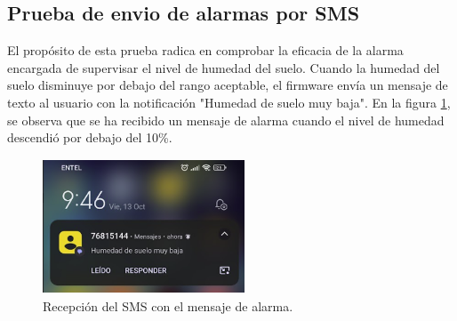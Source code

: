\subsection{Prueba de envio de alarmas por SMS}
El propósito de esta prueba radica en comprobar la eficacia de la alarma encargada de supervisar el nivel de humedad del suelo. Cuando la humedad del suelo disminuye por debajo del rango aceptable, el firmware envía un mensaje de texto al usuario con la notificación "Humedad de suelo muy baja". En la figura \ref{fig:sms alarma}, se observa que se ha recibido un mensaje de alarma cuando el nivel de humedad descendió por debajo del 10\%.

\begin{figure}[h!]
  \centering
    \includegraphics[width=6cm, height=4cm]{./Figures/sms_alarma2.png}
  \caption{Recepción del SMS con el mensaje  de alarma.}
    \label{fig:sms alarma}
\end{figure}

\label{sec:pruebasHW}

\clearpage
\clearpage
